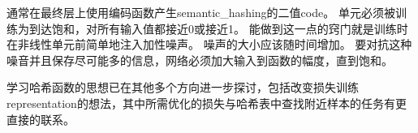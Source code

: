 通常在最终层上使用编码函数产生\gls{semantic_hashing}的二值\gls{code}。
单元必须被训练为到达饱和，对所有输入值都接近0或接近1。
能做到这一点的窍门就是训练时在非线性单元前简单地注入加性噪声。
噪声的大小应该随时间增加。
要对抗这种噪音并且保存尽可能多的信息，网络必须加大输入到函数的幅度，直到饱和。


学习哈希函数的思想已在其他多个方向进一步探讨，包括改变损失训练\gls{representation}的想法，其中所需优化的损失与哈希表中查找附近样本的任务有更直接的联系\citep{Norouzi+Fleet-ICML2011}。
